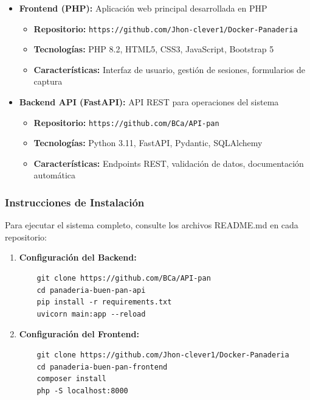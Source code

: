 \documentclass[conference]{IEEEtran}
\begin{document}
\begin{itemize}
    \item \textbf{Frontend (PHP):} Aplicación web principal desarrollada en PHP
    \begin{itemize}
        \item \textbf{Repositorio:} \texttt{https://github.com/Jhon-clever1/Docker-Panaderia}
        \item \textbf{Tecnologías:} PHP 8.2, HTML5, CSS3, JavaScript, Bootstrap 5
        \item \textbf{Características:} Interfaz de usuario, gestión de sesiones, formularios de captura
    \end{itemize}
    
    \item \textbf{Backend API (FastAPI):} API REST para operaciones del sistema
    \begin{itemize}
        \item \textbf{Repositorio:} \texttt{https://github.com/BCa/API-pan}
        \item \textbf{Tecnologías:} Python 3.11, FastAPI, Pydantic, SQLAlchemy
        \item \textbf{Características:} Endpoints REST, validación de datos, documentación automática
    \end{itemize}
\end{itemize}

\subsubsection{Instrucciones de Instalación}
Para ejecutar el sistema completo, consulte los archivos README.md en cada repositorio:

\begin{enumerate}
    \item \textbf{Configuración del Backend:}
    \begin{verbatim}
    git clone https://github.com/BCa/API-pan
    cd panaderia-buen-pan-api
    pip install -r requirements.txt
    uvicorn main:app --reload
    \end{verbatim}
    
    \item \textbf{Configuración del Frontend:}
    \begin{verbatim}
    git clone https://github.com/Jhon-clever1/Docker-Panaderia
    cd panaderia-buen-pan-frontend
    composer install
    php -S localhost:8000
    \end{verbatim}
\end{enumerate}
\end{document}
